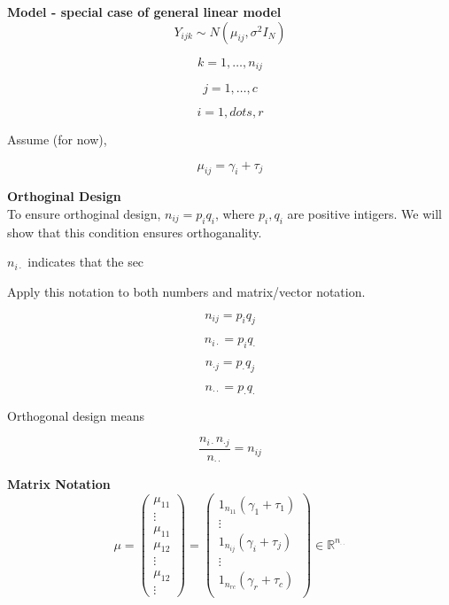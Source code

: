 \documentclass[11pt,fleqn]{book} %
\begin{document}
\textbf{Model - special case of general linear model}\\

		$$Y_{ijk} \sim N(\mu_{ij}, \sigma^2 I_N) $$

		$$k= 1, \dots, n_{ij} $$

		$$j = 1, \dots, c $$

		$$i = 1, dots, r $$

Assume (for now), 

		$$\mu_{ij} = \gamma_i + \tau_j $$

\textbf{Orthoginal Design}\\

To ensure orthoginal design, $n_{ij} = p_iq_i$, where $p_i, q_i$ are positive intigers. We will show that this condition ensures orthoganality. \\


\begin{notation}
	$n_{i\cdot} $ indicates that the sec
\end{notation}

Apply this notation to both numbers and matrix/vector notation. 

	$$n_{ij} = p_i q_j $$

	$$n_{i\cdot} = p_i q_\cdot $$

	$$ n_{\cdot j} = p_\cdot q_j $$

	$$ n_{\cdot \cdot} = p_\cdot q_\cdot $$

	

Orthogonal design means

		$$\frac{n_{i\cdot}n_{\cdot j}}{n_{\cdot \cdot}} = n_{ij} $$


\textbf{Matrix Notation}\\

		$$ \mu = \begin{pmatrix}
			\mu_{11}\\
			\vdots \\
			\mu_{11}\\
			\mu_{12}\\
			\vdots \\
			\mu_{12}\\
			\vdots
		\end{pmatrix} = \begin{pmatrix}
			1_{n_{11}} (\gamma_1 + \tau_1)\\
			\vdots\\
			1_{n_{ij}} (\gamma_i + \tau_j)\\
			\vdots\\
			1_{n_{rc}} (\gamma_r + \tau_c)\\
		\end{pmatrix} \in \mathbb{R}^{n_{\cdot \cdot}}$$
\end{document}
